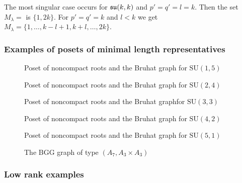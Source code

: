 The most singular case occurs for $\mathfrak{su}(k,k)$ and $p'=q'=l = k $. Then the set $M_\lambda =$ is $\{1,2k\}$. For $p'=q'=k$ and $l<k$ we get $M_\lambda = \{ 1,\ldots,k-l+1,k+l,\ldots, 2k \}$.

\subsubsection*{Examples of posets of minimal length representatives}

\begin{figure}[H]
  \centering 
   
	 
  \caption{Poset of noncompact roots and the Bruhat graph for $\mathrm{SU}(1,5)$}
\end{figure} 

\begin{figure}[H]
  \centering 
   
	 
  \caption{Poset of noncompact roots and the Bruhat graph for $\mathrm{SU}(2,4)$}
\end{figure} 

\begin{figure}[H]
  \centering 
	\resizebox{\textwidth}{!}{
   
	 
	}
  \caption{Poset of noncompact roots and the Bruhat graphfor $\mathrm{SU}(3,3)$}
\end{figure} 

\begin{figure}[H]
  \centering 
   
	 
  \caption{Poset of noncompact roots and the Bruhat graph for $\mathrm{SU}(4,2)$}
\end{figure} 

\begin{figure}[H]
  \centering 
  
	
  \caption{Poset of noncompact roots and the Bruhat graph for $\mathrm{SU}(5,1)$}
\end{figure} 

\begin{figure}[H]
  \centering 
  
  \caption{The BGG graph of type $(A_7,A_3\times A_3)$}
\end{figure} 

\subsubsection*{Low rank examples}




